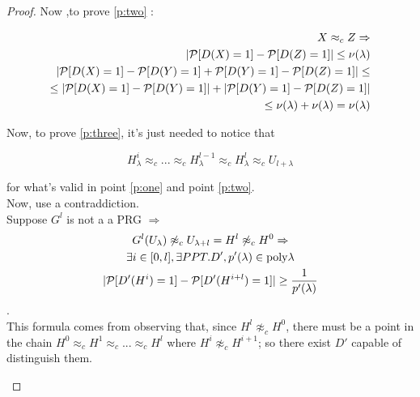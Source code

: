\begin{proof}
Now ,to prove \ref{p:two} :

\begin{align}
    X \approx_{c} Z \Rightarrow \\
    | \P [ D(X)=1 ] - \P [ D(Z)=1 ]   | \leq \nu(\lambda) \\
    | \P [ D(X)=1 ] - \P [ D(Y)=1 ] + \P [ D(Y)=1 ] -  \P [ D(Z)=1]   | \leq\\
    \leq | \P [ D(X)=1 ] - \P [ D(Y)=1 ]  | + | \P [ D(Y)=1 ] - \P [ D(Z)=1 ]| \\
    \leq \nu(\lambda) + \nu(\lambda) = \nu(\lambda) 
\end{align}

Now, to prove \ref{p:three}, it's just needed to notice that 

\begin{equation} \label{eq:hiequll}
        H_{\lambda}^{i} \approx_{c} ... \approx_{c}  H_{\lambda}^{l-1} \approx_{c} H_{\lambda}^{l} \approx_{c}  U_{l+\lambda}
    \end{equation}
    

for what's valid in point \ref{p:one} and point \ref{p:two}.\\

Now, use a contraddiction.\\
Suppose $G^{l}$ is not a a PRG $\Rightarrow$ \\

\begin{gather*}
    G^{l}(U_{\lambda}) \not\approx_{c} U_{\lambda + l} = H^{l} \not\approx_{c}
    H^{0} \Rightarrow  \\
    \exists i \in [0,l] , \exists PPT.D'  , p'(\lambda) \in \poly{\lambda} \\
    | \P [ D'(H^{i})=1 ] - \P [ D'(H^{i+l})=1 ]   | \geq \frac{1}{p'(\lambda)}
\end{gather*}.\\
This formula comes from observing that, since $H^{l} \not \approx_{c} H^{0}$,
there must be a point in the chain $H^{0} \approx_{c}  H^{1} \approx_{c} ...
\approx_{c} H^{l}$ where $H^{i} \not \approx_{c} H^{i+1}$; so
there exist $D'$ capable of distinguish them.\newpage
\begin{figure}[h!]
   \centering
   \sdinit{}
\end{figure}
\end{proof}
